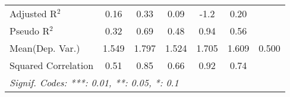 \begin{tabular}{lcccccc}
   Adjusted R$^2$                                             & 0.16    & 0.33          & 0.09    & -1.2    & 0.20    & \\  
   Pseudo R$^2$                                               & 0.32    & 0.69          & 0.48    & 0.94    & 0.56    & \\  
Mean(Dep. Var.) & 1.549 & 1.797 & 1.524 & 1.705 & 1.609 & 0.500 \\
   Squared Correlation                                        & 0.51    & 0.85          & 0.66    & 0.92    & 0.74    & \\  
   \midrule \midrule
   \multicolumn{7}{l}{\emph{Signif. Codes: ***: 0.01, **: 0.05, *: 0.1}}\\
\end{tabular}
\par\endgroup

